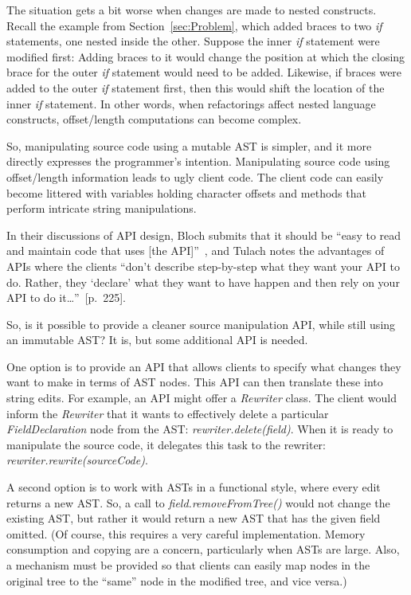 \documentclass[prodmode]{acmlarge}
\begin{document}
The situation gets a bit worse when changes are made to nested constructs.
Recall the example from Section~\ref{sec:Problem}, which added braces to two
\textit{if} statements, one nested inside the other.  Suppose the inner
\textit{if} statement were modified first: Adding braces to it would change the
position at which the closing brace for the outer \textit{if} statement would
need to be added.  Likewise, if braces were added to the outer \textit{if}
statement first, then this would shift the location of the inner \textit{if}
statement.  In other words, when refactorings affect nested language
constructs, offset/length computations can become complex.

So, manipulating source code using a mutable AST is simpler, and it more
directly expresses the programmer's intention.  Manipulating source code using
offset/length information leads to ugly client code.  The client code can
easily become littered with variables holding character offsets and methods
that perform intricate string manipulations.

In their discussions of API design, Bloch submits that it should be ``easy to
read and maintain code that uses [the API]''~\cite{bloch}, and Tulach notes the
advantages of APIs where the clients ``don't describe step-by-step what they
want your API to do.  Rather, they `declare' what they want to have happen and
then rely on your API to do it\dots''~[p.~225]\cite{tulach08practical}.

So, is it possible to provide a cleaner source manipulation API, while still
using an immutable AST?  It is, but some additional API is needed.

One option is to provide an API that allows clients to specify what changes
they want to make in terms of AST nodes.  This API can then translate these
into string edits.  For example, an API might offer a \textit{Rewriter} class.
The client would inform the \textit{Rewriter} that it wants to effectively
delete a particular \textit{FieldDeclaration} node from the AST:
\textit{rewriter.delete(field)}.  When it is ready to manipulate the source
code, it delegates this task to the rewriter:
\textit{rewriter.rewrite(sourceCode)}.

A second option is to work with ASTs in a functional style, where every edit
returns a new AST.  So, a call to \textit{field.removeFromTree()} would not
change the existing AST, but rather it would return a new AST that has the
given field omitted.  (Of course, this requires a very careful implementation.
Memory consumption and copying are a concern, particularly when ASTs are large.
Also, a mechanism must be provided so that clients can easily map nodes in the
original tree to the ``same'' node in the modified tree, and vice versa.)
\end{document}
